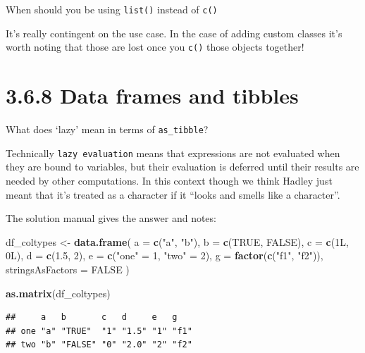 \documentclass[]{book}
\newenvironment{Shaded}{\begin{snugshade}}{\end{snugshade}}
\newcommand{\DataTypeTok}[1]{\textcolor[rgb]{0.13,0.29,0.53}{#1}}
\newcommand{\DecValTok}[1]{\textcolor[rgb]{0.00,0.00,0.81}{#1}}
\newcommand{\FloatTok}[1]{\textcolor[rgb]{0.00,0.00,0.81}{#1}}
\newcommand{\KeywordTok}[1]{\textcolor[rgb]{0.13,0.29,0.53}{\textbf{#1}}}
\newcommand{\NormalTok}[1]{#1}
\newcommand{\OtherTok}[1]{\textcolor[rgb]{0.56,0.35,0.01}{#1}}
\newcommand{\StringTok}[1]{\textcolor[rgb]{0.31,0.60,0.02}{#1}}
\begin{document}
When should you be using \texttt{list()} instead of \texttt{c()}

It's really contingent on the use case. In the case of adding custom classes it's worth noting that those are lost once you \texttt{c()} those objects together!

\hypertarget{data-frames-and-tibbles}{%
\section*{3.6.8 Data frames and tibbles}\label{data-frames-and-tibbles}}

What does `lazy' mean in terms of \texttt{as\_tibble}?

Technically \texttt{lazy\ evaluation} means that expressions are not evaluated when they are bound to variables, but their evaluation is deferred until their results are needed by other computations. In this context though we think Hadley just meant that it's treated as a character if it ``looks and smells like a character''.

The solution manual gives the answer and notes:

\begin{Shaded}
\begin{Highlighting}[]
\NormalTok{df_coltypes <-}\StringTok{ }\KeywordTok{data.frame}\NormalTok{(}
  \DataTypeTok{a =} \KeywordTok{c}\NormalTok{(}\StringTok{"a"}\NormalTok{, }\StringTok{"b"}\NormalTok{),}
  \DataTypeTok{b =} \KeywordTok{c}\NormalTok{(}\OtherTok{TRUE}\NormalTok{, }\OtherTok{FALSE}\NormalTok{),}
  \DataTypeTok{c =} \KeywordTok{c}\NormalTok{(1L, 0L),}
  \DataTypeTok{d =} \KeywordTok{c}\NormalTok{(}\FloatTok{1.5}\NormalTok{, }\DecValTok{2}\NormalTok{),}
  \DataTypeTok{e =} \KeywordTok{c}\NormalTok{(}\StringTok{"one"}\NormalTok{ =}\StringTok{ }\DecValTok{1}\NormalTok{, }\StringTok{"two"}\NormalTok{ =}\StringTok{ }\DecValTok{2}\NormalTok{),}
  \DataTypeTok{g =} \KeywordTok{factor}\NormalTok{(}\KeywordTok{c}\NormalTok{(}\StringTok{"f1"}\NormalTok{, }\StringTok{"f2"}\NormalTok{)),}
  \DataTypeTok{stringsAsFactors =} \OtherTok{FALSE}
\NormalTok{)}

\KeywordTok{as.matrix}\NormalTok{(df_coltypes)}
\end{Highlighting}
\end{Shaded}

\begin{verbatim}
##     a   b       c   d     e   g   
## one "a" "TRUE"  "1" "1.5" "1" "f1"
## two "b" "FALSE" "0" "2.0" "2" "f2"
\end{verbatim}
\end{document}
